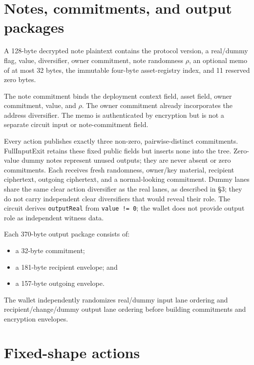 \documentclass[11pt,letterpaper]{article}
\providecommand{\tightlist}{\setlength{\itemsep}{0pt}\setlength{\parskip}{0pt}}
\begin{document}
\section{Notes, commitments, and output
packages}\label{notes-commitments-and-output-packages}

A 128-byte decrypted note plaintext contains the protocol version, a
real/\allowbreak{}dummy flag, value, diversifier, owner commitment, note
randomness \(\rho\), an optional memo of at most 32 bytes, the immutable
four-byte asset-registry index, and 11 reserved zero bytes.

The note commitment binds the deployment context field, asset field,
owner commitment, value, and \(\rho\). The owner commitment already
incorporates the address diversifier. The memo is authenticated by
encryption but is not a separate circuit input or note-commitment field.

Every action publishes exactly three non-zero, pairwise-distinct
commitments. FullInputExit retains these fixed public fields but inserts
none into the tree. Zero-value dummy notes represent unused outputs;
they are never absent or zero commitments. Each receives fresh
randomness, owner/\allowbreak{}key material, recipient ciphertext,
outgoing ciphertext, and a normal-looking commitment. Dummy lanes share
the same clear action diversifier as the real lanes, as described in \S{}3;
they do not carry independent clear diversifiers that would reveal their
role. The circuit derives \texttt{outputReal} from
\texttt{value\ !=\ 0}; the wallet does not provide output role as
independent witness data.

Each 370-byte output package consists of:

\begin{itemize}
\tightlist
\item
  a 32-byte commitment;
\item
  a 181-byte recipient envelope; and
\item
  a 157-byte outgoing envelope.
\end{itemize}

The wallet independently randomizes real/\allowbreak{}dummy input lane
ordering and recipient/\allowbreak{}change/\allowbreak{}dummy output
lane ordering before building commitments and encryption envelopes.

\section{Fixed-shape actions}\label{fixed-shape-actions}
\end{document}
